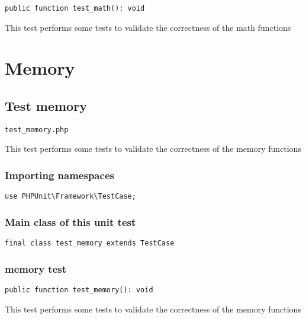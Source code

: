 \documentclass[a4paper]{article}
\begin{document}
\begin{lstlisting}
public function test_math(): void
\end{lstlisting}

This test performs some tests to validate the correctness
of the math functions


\hypertarget{toc296}{}
\section{Memory}

\hypertarget{toc297}{}
\subsection{Test memory}

\begin{lstlisting}
test_memory.php
\end{lstlisting}

This test performs some tests to validate the correctness
of the memory functions

\hypertarget{toc298}{}
\subsubsection{Importing namespaces}

\begin{lstlisting}
use PHPUnit\Framework\TestCase;
\end{lstlisting}

\hypertarget{toc299}{}
\subsubsection{Main class of this unit test}

\begin{lstlisting}
final class test_memory extends TestCase
\end{lstlisting}

\hypertarget{toc300}{}
\subsubsection{memory test}

\begin{lstlisting}
public function test_memory(): void
\end{lstlisting}

This test performs some tests to validate the correctness
of the memory functions


\hypertarget{toc301}{}
\end{document}
